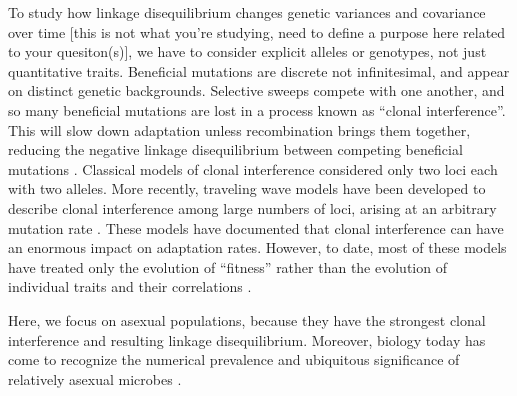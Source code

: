 \documentclass[9pt,twocolumn,twoside]{gsajnl}
\begin{document}
To study how linkage disequilibrium changes genetic variances and covariance over time [this is not what you're studying, need to define a purpose here related to your quesiton(s)], we have to consider explicit alleles or genotypes, not just quantitative traits. Beneficial mutations are discrete not infinitesimal, and appear on distinct genetic backgrounds. Selective sweeps compete with one another, and so many beneficial mutations are lost in a process known as ``clonal interference''. This will slow down adaptation \citep{hill1966effect} unless recombination brings them together, reducing the negative linkage disequilibrium between competing beneficial mutations \cite{fisher1930genetical,muller1932some}. Classical models of clonal interference considered only two loci each with two alleles. More recently, traveling wave models have been developed to describe clonal interference among large numbers of loci, arising at an arbitrary mutation rate \citep{rouzine2003solitary,desai2007beneficial,park2010speed,good2012distribution,neher2010rate,fisher2013asexual,rouzine2010multi,rouzine2007highly,rouzine2008traveling}. These models have documented that clonal interference can have an enormous impact on adaptation rates. However, to date, most of these models have treated only the evolution of ``fitness'' rather than the evolution of individual traits and their correlations \cite{}. \par

% 
% 
% 
%
% 
% 
% 
% 

Here, we focus on asexual populations, because they have the strongest clonal interference and resulting linkage disequilibrium. Moreover, biology today has come to recognize the numerical prevalence and ubiquitous significance of relatively asexual microbes \cite{mcfall2013animals}.\par
\end{document}
